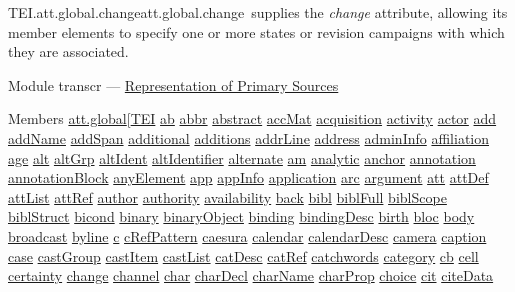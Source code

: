 \begin{reflist}
\item[]\begin{specHead}{TEI.att.global.change}{att.global.change} supplies the {\itshape change} attribute, allowing its member elements to specify one or more states or revision campaigns with which they are associated.\end{specHead} 
    \item[{Module}]
  transcr — \hyperref[PH]{Representation of Primary Sources}
    \item[{Members}]
  \hyperref[TEI.att.global]{att.global}[\hyperref[TEI.TEI]{TEI} \hyperref[TEI.ab]{ab} \hyperref[TEI.abbr]{abbr} \hyperref[TEI.abstract]{abstract} \hyperref[TEI.accMat]{accMat} \hyperref[TEI.acquisition]{acquisition} \hyperref[TEI.activity]{activity} \hyperref[TEI.actor]{actor} \hyperref[TEI.add]{add} \hyperref[TEI.addName]{addName} \hyperref[TEI.addSpan]{addSpan} \hyperref[TEI.additional]{additional} \hyperref[TEI.additions]{additions} \hyperref[TEI.addrLine]{addrLine} \hyperref[TEI.address]{address} \hyperref[TEI.adminInfo]{adminInfo} \hyperref[TEI.affiliation]{affiliation} \hyperref[TEI.age]{age} \hyperref[TEI.alt]{alt} \hyperref[TEI.altGrp]{altGrp} \hyperref[TEI.altIdent]{altIdent} \hyperref[TEI.altIdentifier]{altIdentifier} \hyperref[TEI.alternate]{alternate} \hyperref[TEI.am]{am} \hyperref[TEI.analytic]{analytic} \hyperref[TEI.anchor]{anchor} \hyperref[TEI.annotation]{annotation} \hyperref[TEI.annotationBlock]{annotationBlock} \hyperref[TEI.anyElement]{anyElement} \hyperref[TEI.app]{app} \hyperref[TEI.appInfo]{appInfo} \hyperref[TEI.application]{application} \hyperref[TEI.arc]{arc} \hyperref[TEI.argument]{argument} \hyperref[TEI.att]{att} \hyperref[TEI.attDef]{attDef} \hyperref[TEI.attList]{attList} \hyperref[TEI.attRef]{attRef} \hyperref[TEI.author]{author} \hyperref[TEI.authority]{authority} \hyperref[TEI.availability]{availability} \hyperref[TEI.back]{back} \hyperref[TEI.bibl]{bibl} \hyperref[TEI.biblFull]{biblFull} \hyperref[TEI.biblScope]{biblScope} \hyperref[TEI.biblStruct]{biblStruct} \hyperref[TEI.bicond]{bicond} \hyperref[TEI.binary]{binary} \hyperref[TEI.binaryObject]{binaryObject} \hyperref[TEI.binding]{binding} \hyperref[TEI.bindingDesc]{bindingDesc} \hyperref[TEI.birth]{birth} \hyperref[TEI.bloc]{bloc} \hyperref[TEI.body]{body} \hyperref[TEI.broadcast]{broadcast} \hyperref[TEI.byline]{byline} \hyperref[TEI.c]{c} \hyperref[TEI.cRefPattern]{cRefPattern} \hyperref[TEI.caesura]{caesura} \hyperref[TEI.calendar]{calendar} \hyperref[TEI.calendarDesc]{calendarDesc} \hyperref[TEI.camera]{camera} \hyperref[TEI.caption]{caption} \hyperref[TEI.case]{case} \hyperref[TEI.castGroup]{castGroup} \hyperref[TEI.castItem]{castItem} \hyperref[TEI.castList]{castList} \hyperref[TEI.catDesc]{catDesc} \hyperref[TEI.catRef]{catRef} \hyperref[TEI.catchwords]{catchwords} \hyperref[TEI.category]{category} \hyperref[TEI.cb]{cb} \hyperref[TEI.cell]{cell} \hyperref[TEI.certainty]{certainty} \hyperref[TEI.change]{change} \hyperref[TEI.channel]{channel} \hyperref[TEI.char]{char} \hyperref[TEI.charDecl]{charDecl} \hyperref[TEI.charName]{charName} \hyperref[TEI.charProp]{charProp} \hyperref[TEI.choice]{choice} \hyperref[TEI.cit]{cit} \hyperref[TEI.citeData]{citeData} 
\end{reflist}
